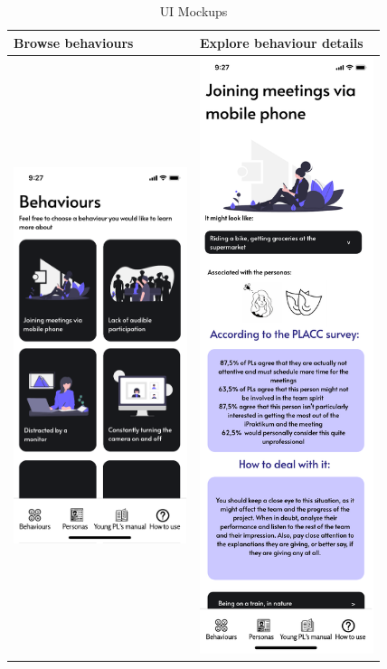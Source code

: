 \begin{longtable}[ht]{ p{}  p{} }
\caption{UI Mockups}
\label{tab:mockups}\\
\hline
\textbf{Browse behaviours} & \textbf{Explore behaviour details} \\
    \hline
   \includegraphics[valign=t, width=2in]{figures/Behaviours.pdf} &   		\includegraphics[valign=t, width=2in]{figures/ASpecificBehaviour.pdf} \\

\end{longtable}

